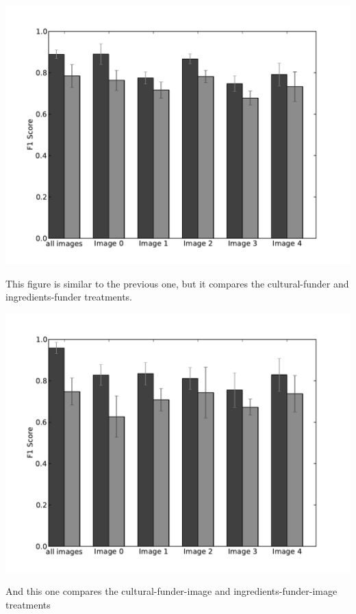 \documentclass[letterpaper]{article}
\begin{document}
\begin{center}
\includegraphics[scale=0.65]{../figs/longitude_cult-ing-fund.pdf}
\end{center}
This figure is similar to the previous one, but it compares the cultural-funder
and ingredients-funder treatments.

\begin{center}
\includegraphics[scale=0.65]{../figs/longitude_cult-ing-img-fund.pdf}
\end{center}
And this one compares the cultural-funder-image and ingredients-funder-image
treatments
\end{document}
